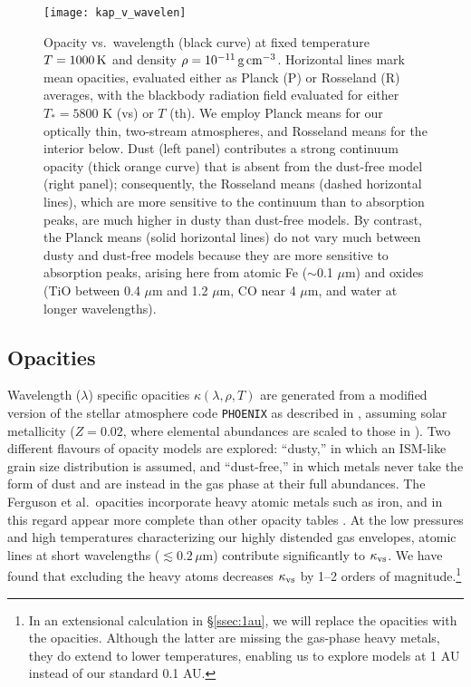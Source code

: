 \documentclass[fleqn,useAMS,usenatbib]{mnras}
\begin{document}
\begin{figure*}
    \centering
    \texttt{[image: kap\_v\_wavelen]}
    \caption{Opacity vs.~wavelength (black curve) at fixed temperature
    $T = 1000\,{\rm K}$ and density $\rho = 10^{-11}\,{\rm g\,cm^{-3}}$.
    Horizontal lines mark mean opacities, evaluated either as
    Planck (P) or Rosseland (R) averages, with the blackbody radiation
    field evaluated for either $T_\ast = 5800$ K (vs) or $T$ (th).
    We employ Planck means for our optically thin, two-stream atmospheres,
    and Rosseland means for the interior below. Dust (left panel) contributes
    a strong continuum opacity (thick orange curve) that is absent from the
    dust-free model (right panel); consequently, the Rosseland means
    (dashed horizontal lines), which are more sensitive to the continuum
    than to absorption peaks, are much higher in dusty than dust-free models.
    By contrast, the Planck means (solid horizontal lines) do not vary
    much between dusty and dust-free models because they are more sensitive
    to absorption peaks, arising here from atomic Fe ($\sim$0.1 $\mu$m)
    and oxides (TiO between 
    0.4 $\mu$m and 1.2 $\mu$m, CO near 4 $\mu$m, and water at longer wavelengths).}
    \label{fig3}
\end{figure*}

\subsection{Opacities}
\label{ssec:opacity}

Wavelength ($\lambda$) specific
opacities $\kappa(\lambda,\rho,T)$ are generated 
from 
a modified version of the stellar atmosphere code \texttt{PHOENIX}
as described in
\citet{ferguson05}, assuming 
solar metallicity ($Z=0.02$, where elemental
abundances are scaled to those in \citealt{GN93}).
Two different flavours of opacity models are explored: ``dusty,''
in which an ISM-like grain size distribution is assumed, and ``dust-free,''
in which metals never take the form of dust and are instead in the
gas phase at their full abundances.
The Ferguson et al.~opacities incorporate heavy atomic metals
such as iron, and in this regard appear more complete
than other opacity tables \citep[e.g.,][]{freedman14}.
At the low pressures and high temperatures 
characterizing our highly distended gas envelopes,
atomic lines at short wavelengths ($\lesssim 0.2 \,\mu$m)
contribute significantly to $\kappa_{\rm vs}$.
We have found that excluding the heavy atoms
decreases $\kappa_{\rm vs}$ by 1--2 orders of magnitude.\footnote{In an extensional calculation in \S\ref{ssec:1au}, we will replace the \citet{ferguson05} opacities
with the \citet{freedman14} opacities. Although the latter are missing the
gas-phase heavy metals, they do extend to lower temperatures,
enabling us to explore models at 1 AU instead of our standard 0.1 AU.}
\end{document}
